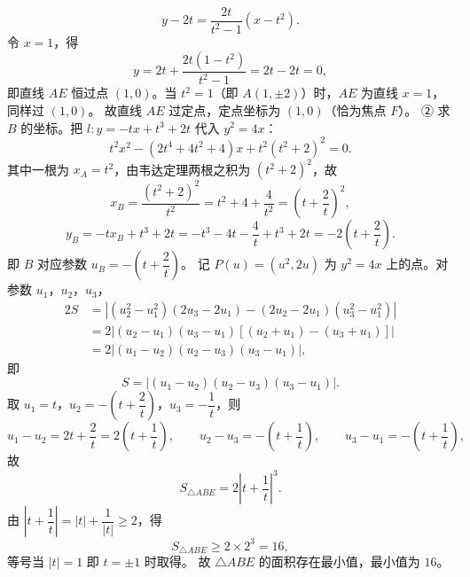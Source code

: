 \begin{answer}
\[y-2t=\frac{2t}{t^2-1}\left(x-t^2\right).\]
令 $x=1$，得
\nopagebreak[4]
\[y=2t+\frac{2t\left(1-t^2\right)}{t^2-1}=2t-2t=0,\]
即直线 $AE$ 恒过点 $(1,0)$。当 $t^2=1$（即 $A(1,\pm2)$）时，$AE$ 为直线 $x=1$，同样过 $(1,0)$。
故直线 $AE$ 过定点，定点坐标为 $(1,0)$（恰为焦点 $F$）。
② 求 $B$ 的坐标。把 $l:y=-tx+t^3+2t$ 代入 $y^2=4x$：
\nopagebreak[4]
\[t^2x^2-\left(2t^4+4t^2+4\right)x+t^2\left(t^2+2\right)^2=0 .\]
其中一根为 $x_A=t^2$，由韦达定理两根之积为 $\left(t^2+2\right)^2$，故
\nopagebreak[4]
\[x_B=\frac{\left(t^2+2\right)^2}{t^2}=t^2+4+\frac4{t^2}=\left(t+\frac2t\right)^2,\]
\nopagebreak[4]
\[y_B=-tx_B+t^3+2t=-t^3-4t-\frac4t+t^3+2t=-2\left(t+\frac2t\right).\]
即 $B$ 对应参数 $u_B=-\left(t+\dfrac2t\right)$。
记 $P(u)=\left(u^2,2u\right)$ 为 $y^2=4x$ 上的点。对参数 $u_1$，$u_2$，$u_3$，
\nopagebreak[4]
\[\begin{aligned}
2S&=\left|\left(u_2^2-u_1^2\right)\left(2u_3-2u_1\right)-\left(2u_2-2u_1\right)\left(u_3^2-u_1^2\right)\right|\\
&=2\left|(u_2-u_1)(u_3-u_1)\left[(u_2+u_1)-(u_3+u_1)\right]\right|\\
&=2\left|(u_1-u_2)(u_2-u_3)(u_3-u_1)\right|,
\end{aligned}\]
即
\nopagebreak[4]
\[S=\left|(u_1-u_2)(u_2-u_3)(u_3-u_1)\right| .\]
取 $u_1=t$，$u_2=-\left(t+\dfrac2t\right)$，$u_3=-\dfrac1t$，则
\nopagebreak[4]
\[u_1-u_2=2t+\frac2t=2\left(t+\frac1t\right),\qquad
u_2-u_3=-\left(t+\frac1t\right),\qquad
u_3-u_1=-\left(t+\frac1t\right),\]
故
\nopagebreak[4]
\[S_{\triangle ABE}=2\left|t+\frac1t\right|^3 .\]
由 $\left|t+\dfrac1t\right|=\left|t\right|+\dfrac1{\left|t\right|}\geqslant2$，得
\nopagebreak[4]
\[S_{\triangle ABE}\geqslant2\times2^3=16,\]
等号当 $\left|t\right|=1$ 即 $t=\pm1$ 时取得。
故 $\triangle ABE$ 的面积存在最小值，最小值为 $16$。



\end{answer}
